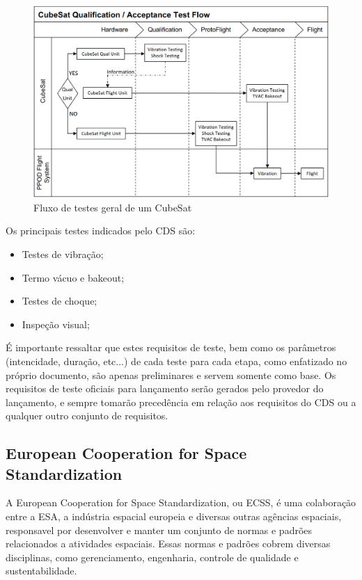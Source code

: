 \begin{figure}[htp]
    \caption{Fluxo de testes geral de um CubeSat}
    \begin{center}
        \includegraphics[width=\textwidth, keepaspectratio]{images/test-flow-diagram-cds.png}
    \end{center}
    \label{fig:test-flow-cds}
\end{figure}

Os principais testes indicados pelo \gls{CDS} são:
\begin{itemize}
    \item Testes de vibração;
    \item Termo vácuo e bakeout;
    \item Testes de choque;
    \item Inspeção visual;
\end{itemize}

É importante ressaltar que estes requisitos de teste, bem como os parâmetros (intencidade, duração, etc...) de cada teste para cada etapa, como enfatizado no próprio documento, são apenas preliminares e servem somente como base. Os requisitos de teste oficiais para lançamento serão gerados pelo provedor do lançamento, e sempre tomarão precedência em relação aos requisitos do \gls{CDS} ou a qualquer outro conjunto de requisitos.


\subsection{European Cooperation for Space Standardization}

A European Cooperation for Space Standardization, ou \gls{ECSS}, é uma colaboração entre a \gls{ESA}, a indústria espacial europeia e diversas outras agências espaciais, responsavel por desenvolver e manter um conjunto de normas e padrões relacionados a atividades espaciais. Essas normas e padrões cobrem diversas disciplinas, como gerenciamento, engenharia, controle de qualidade e sustentabilidade.

